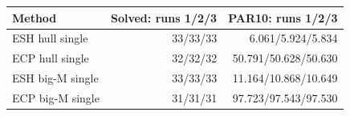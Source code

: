 \begin{tabular}{lrr}
\toprule
Method & Solved: runs 1/2/3 & PAR10: runs 1/2/3 \\
\midrule
ESH hull single & 33/33/33 & 6.061/5.924/5.834 \\
ECP hull single & 32/32/32 & 50.791/50.628/50.630 \\
ESH big-M single & 33/33/33 & 11.164/10.868/10.649 \\
ECP big-M single & 31/31/31 & 97.723/97.543/97.530 \\
\bottomrule
\end{tabular}

